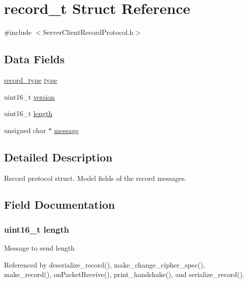 \hypertarget{structrecord__t}{}\section{record\+\_\+t Struct Reference}
\label{structrecord__t}


{\ttfamily \#include $<$Server\+Client\+Record\+Protocol.\+h$>$}

\subsection*{Data Fields}
\begin{DoxyCompactItemize}
\item 
\hyperlink{_server_client_record_protocol_8h_a393986e23103348f07699f24dcb7f238}{record\+\_\+type} \hyperlink{structrecord__t_ad19c98be8b3445585bee3545c78f6d9c}{type}
\item 
uint16\+\_\+t \hyperlink{structrecord__t_ab6d7b6f8c2ceaba7acda80aaf05f4899}{version}
\item 
uint16\+\_\+t \hyperlink{structrecord__t_a1892eba2086d12ac2b09005aeb09ea3b}{length}
\item 
unsigned char $\ast$ \hyperlink{structrecord__t_abb13456032cf48eaa794391b6ed937c7}{message}
\end{DoxyCompactItemize}


\subsection{Detailed Description}
Record protocol struct. Model fields of the record messages. 

\subsection{Field Documentation}
\subsubsection[{\texorpdfstring{length}{length}}]{\setlength{\rightskip}{0pt plus 5cm}uint16\+\_\+t length}\hypertarget{structrecord__t_a1892eba2086d12ac2b09005aeb09ea3b}{}\label{structrecord__t_a1892eba2086d12ac2b09005aeb09ea3b}
Message to send length 

Referenced by deserialize\+\_\+record(), make\+\_\+change\+\_\+cipher\+\_\+spec(), make\+\_\+record(), on\+Packet\+Receive(), print\+\_\+handshake(), and serialize\+\_\+record().

